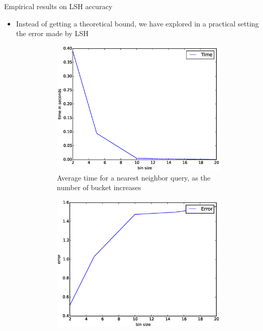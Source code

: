 \documentclass[11pt)]{beamer}
\begin{document}
\begin{frame}{Empirical results on LSH accuracy}
\begin{itemize}
\item Instead of getting a theoretical bound, we have explored in a practical setting the error made by LSH
\begin{figure}[!h]
 \begin{subfigure}{0.27\textwidth}
   \includegraphics[width=\textwidth]{time_binsize.eps}
   \caption{Average time for a nearest neighbor query, as the number of bucket increases}
 \end{subfigure}\hfill
 \begin{subfigure}{0.27\textwidth}
   \includegraphics[width=\textwidth]{error_binsize.eps}

\end{subfigure}
\end{figure}
\end{itemize}
\end{frame}
\end{document}
